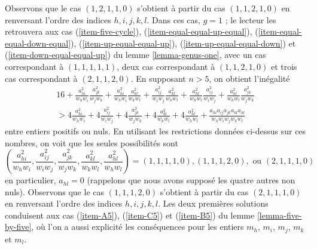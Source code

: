 Observons que le cas $(1, 2, 1, 1, 0)$ s'obtient à partir du cas
$(1, 1, 2, 1, 0)$ en renversant l'ordre des indices $h, i, j, k, l$.
Dans ces cas, $g = 1$ ; le lecteur les retrouvera aux cas
(\ref{item-five-cycle}),
(\ref{item-equal-equal-up-equal}), (\ref{item-equal-equal-down-equal}),
(\ref{item-up-equal-equal-up}), (\ref{item-up-equal-equal-down}) et
(\ref{item-down-equal-equal-up}) du lemme \ref{lemma-genus-one},
avec un cas correspondant à $(1, 1, 1, 1, 1)$,
deux cas correspondant à $(1, 1, 2, 1, 0)$ et
trois cas correspondant à $(2, 1, 1, 2, 0)$.
En supposant $n > 5$, on obtient l'inégalité
\begin{align*}
16 + 
\frac{a_{hi}^2}{w_hw_i}\frac{a_{jk}^2}{w_jw_k} +
\frac{a_{hi}^2}{w_hw_i}\frac{a_{kl}^2}{w_kw_l} +
\frac{a_{ij}^2}{w_iw_j}\frac{a_{kl}^2}{w_kw_l} +
\frac{a_{hl}^2}{w_hw_l}\frac{a_{ij}^2}{w_iw_j} +
\frac{a_{hl}^2}{w_hw_l}\frac{a_{jk}^2}{w_jw_k} \\
> 4\frac{a_{hi}^2}{w_hw_i} +
4\frac{a_{ij}^2}{w_iw_j} +
4\frac{a_{jk}^2}{w_jw_k} +
4\frac{a_{kl}^2}{w_kw_l} +
4\frac{a_{hl}^2}{w_hw_l} +
\frac{a_{hi}a_{ij}a_{jk}a_{kl}a_{hl}}{w_hw_iw_jw_kw_l}
\end{align*}
entre entiers positifs ou nuls. En utilisant les restrictions données ci-dessus
sur ces nombres, on voit que les seules possibilités sont
$$
(\frac{a_{hi}^2}{w_hw_i}, \frac{a_{ij}^2}{w_iw_j},
\frac{a_{jk}^2}{w_jw_k}, \frac{a_{kl}^2}{w_kw_l}, \frac{a_{hl}^2}{w_hw_l}) =
(1, 1, 1, 1, 0), (1, 1, 1, 2, 0), \text{ ou } (2, 1, 1, 1, 0)
$$
en particulier, $a_{hl} = 0$ (rappelons que nous avons supposé les quatre autres
non nuls). Observons que le cas $(1, 1, 1, 2, 0)$
s'obtient à partir du cas $(2, 1, 1, 1, 0)$ en renversant l'ordre
des indices $h, i, j, k, l$. Les deux premières solutions conduisent aux
cas (\ref{item-A5}), (\ref{item-C5}) et (\ref{item-B5}) du
lemme \ref{lemma-five-by-five}, où l'on a aussi explicité les
conséquences pour les entiers $m_h$, $m_i$, $m_j$, $m_k$ et $m_l$.

